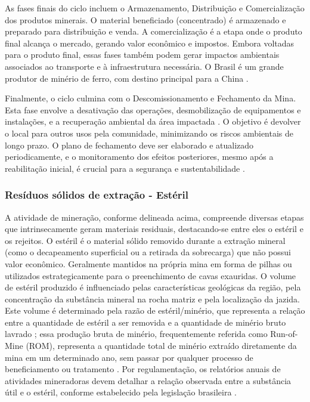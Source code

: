 As fases finais do ciclo incluem o Armazenamento, Distribuição e Comercialização dos produtos minerais. O material beneficiado (concentrado) é armazenado e preparado para distribuição e venda. A comercialização é a etapa onde o produto final alcança o mercado, gerando valor econômico e impostos. Embora voltadas para o produto final, essas fases também podem gerar impactos ambientais associados ao transporte e à infraestrutura necessária. O Brasil é um grande produtor de minério de ferro, com destino principal para a China \cite{freire2020}.

Finalmente, o ciclo culmina com o Descomissionamento e Fechamento da Mina. Esta fase envolve a desativação das operações, desmobilização de equipamentos e instalações, e a recuperação ambiental da área impactada \cite{carvalho2018}. O objetivo é devolver o local para outros usos pela comunidade, minimizando os riscos ambientais de longo prazo. O plano de fechamento deve ser elaborado e atualizado periodicamente, e o monitoramento dos efeitos posteriores, mesmo após a reabilitação inicial, é crucial para a segurança e sustentabilidade \cite{lozano2006}.

\subsubsection{Resíduos sólidos de extração - Estéril}

A atividade de mineração, conforme delineada acima, compreende diversas etapas que intrinsecamente geram materiais residuais, destacando-se entre eles o estéril e os rejeitos. O estéril é o material sólido removido durante a extração mineral (como o decapeamento superficial ou a retirada da sobrecarga) que não possui valor econômico. Geralmente mantidos na própria mina em forma de pilhas ou utilizados estrategicamente para o preenchimento de cavas exauridas. O volume de estéril produzido é influenciado pelas características geológicas da região, pela concentração da substância mineral na rocha matriz e pela localização da jazida. Este volume é determinado pela razão de estéril/minério, que representa a relação entre a quantidade de estéril a ser removida e a quantidade de minério bruto lavrado \cite{freire2020}; essa produção bruta de minério, frequentemente referida como Run-of-Mine (ROM), representa a quantidade total de minério extraído diretamente da mina em um determinado ano, sem passar por qualquer processo de beneficiamento ou tratamento \cite{anm2022}. Por regulamentação, os relatórios anuais de atividades mineradoras devem detalhar a relação observada entre a substância útil e o estéril, conforme estabelecido pela legislação brasileira \cite{brasil1967}.

